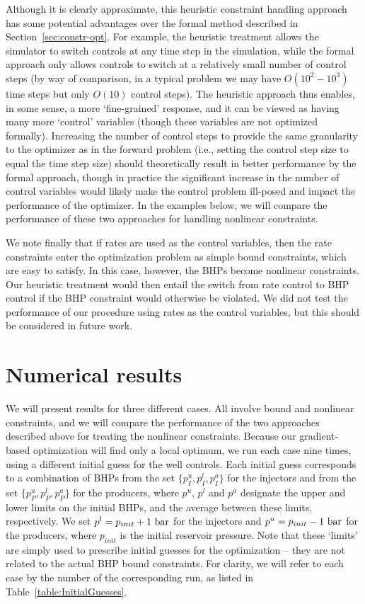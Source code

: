\documentclass[twocolumn,numbook]{svjour3}          %
\begin{document}
Although it is clearly approximate, this heuristic constraint handling approach
has some potential advantages over the formal method described in
Section~\ref{sec:constr-opt}. For example, the heuristic treatment allows the
simulator to switch controls at any time step in the simulation, while the
formal approach only allows controls to switch at a relatively small number of
control steps (by way of comparison, in a typical problem we may have
  $O(10^2-10^3)$ time steps but only $O(10)$ control steps). The heuristic
approach thus enables, in some sense, a more `fine-grained' response, and it can
be viewed as having many more `control' variables (though these variables are
  not optimized formally). Increasing the number of control steps to provide the
same granularity to the optimizer as in the forward problem (i.e., setting the
  control step size to equal the time step size) should theoretically result in
better performance by the formal approach, though in practice the significant
increase in the number of control variables would likely make the control
problem ill-posed and impact the performance of the optimizer. In the examples
below, we will compare the performance of these two approaches for handling
nonlinear constraints.

We note finally that if rates are used as the control variables, then the rate
constraints enter the optimization problem as simple bound constraints, which
are easy to satisfy. In this case, however, the BHPs become nonlinear
constraints. Our heuristic treatment would then entail the switch from rate
control to BHP control if the BHP constraint would otherwise be violated. We did
not test the performance of our procedure using rates as the control variables,
but this should be considered in future work.



\section{Numerical results}  \label{sec:results}

We will present results for three different cases. All involve bound and
nonlinear constraints, and we will compare the performance of the two approaches
described above for treating the nonlinear constraints. Because our
gradient-based optimization will find only a local optimum, we run each case
nine times, using a different initial guess for the well controls. Each initial
guess corresponds to a combination of BHPs from the set $\{p_I^u,p_I^l,p_I^a\}$
for the injectors and from the set $\{p_P^u,p_P^l,p_P^a\}$ for the producers,
where $p^u$, $p^l$ and $p^a$ designate the upper and lower limits on the
initial BHPs, and the average between these limits, respectively. We set
$p^l=p_{init}+1~{\rm bar}$ for the injectors and $p^u=p_{init}-1~{\rm bar}$
for the producers, where $p_{init}$ is the initial reservoir pressure. Note
that these `limits' are simply used to prescribe initial guesses for the
optimization -- they are not related to the actual BHP bound constraints.
For clarity, we will refer to each case by the number of the corresponding
run, as listed in Table~\ref{table:InitialGuesses}.
\end{document}
